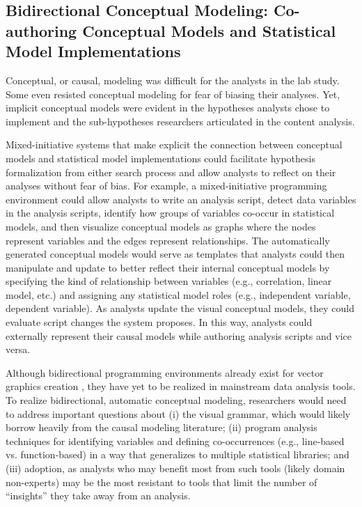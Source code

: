 \subsection*{Bidirectional Conceptual Modeling: Co-authoring Conceptual Models and Statistical Model Implementations}
Conceptual, or causal, modeling was difficult for the analysts in the lab study.
Some even resisted conceptual modeling for fear of biasing their analyses. Yet,
implicit conceptual models were evident in the hypotheses analysts chose to
implement and the sub-hypotheses researchers articulated in the content
analysis. 


Mixed-initiative systems that make explicit the connection between conceptual
models and statistical model implementations could facilitate hypothesis
formalization from either search process and allow analysts to reflect on their
analyses without fear of bias. For example, a mixed-initiative programming
environment could allow analysts to write an analysis script, detect data
variables in the analysis scripts, identify how groups of variables co-occur in
statistical models, and then visualize conceptual models as graphs where the
nodes represent variables and the edges represent relationships. The
automatically generated conceptual models would serve as templates that analysts
could then manipulate and update to better reflect their internal conceptual
models by specifying the kind of relationship between variables (e.g.,
correlation, linear model, etc.) and assigning any statistical model roles
(e.g., independent variable, dependent variable). As analysts update the visual
conceptual models, they could evaluate script changes the system proposes.
In this way, analysts could externally represent their causal models while
authoring analysis scripts and vice versa. 

Although bidirectional programming environments already exist for vector graphics
creation \cite{hempel2019sketch}, they have yet to be realized in mainstream data analysis
tools. To realize bidirectional, automatic conceptual modeling, researchers would
need to address important questions about (i) the visual grammar, which would
likely borrow heavily from the causal modeling literature; (ii) program analysis
techniques for identifying variables and defining co-occurrences (e.g., line-based
vs. function-based) in a way that generalizes to multiple statistical libraries;
and (iii) adoption, as analysts who may benefit most from such tools (likely
domain non-experts) may be the most resistant to tools that limit the number of
``insights'' they take away from an analysis. 

